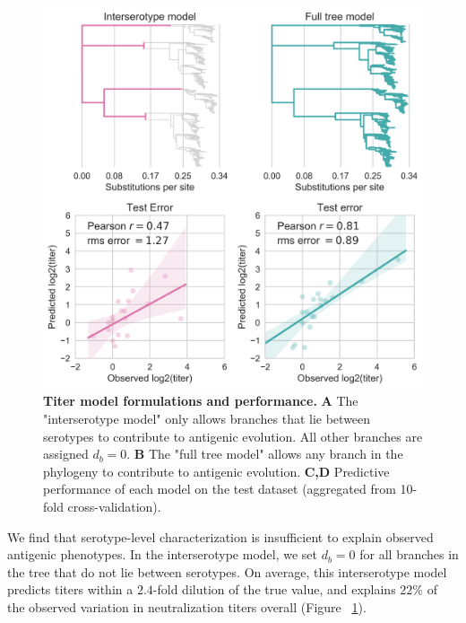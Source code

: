 \documentclass[11pt,oneside,letterpaper]{article}
\begin{document}
\begin{figure}[h]
  \begin{centering}
    \includegraphics[width=.8\textwidth]{../figures/png/titer_model_performance.png}
        \caption{\textbf{Titer model formulations and performance.} \linebreak \textbf{A} The "interserotype model" only allows branches that lie between serotypes to contribute to antigenic evolution. All other branches are assigned $d_b = 0$. \textbf{B} The "full tree model" allows any branch in the phylogeny to contribute to antigenic evolution. \textbf{C,D} Predictive performance of each model on the test dataset (aggregated from 10-fold cross-validation).}
         \label{titer_model_performance}
  \end{centering}
\end{figure}

We find that serotype-level characterization is insufficient to explain observed antigenic phenotypes.
In the interserotype model, we set $d_b = 0$ for all branches in the tree that do not lie between serotypes.
On average, this interserotype model predicts titers within a $2.4$-fold dilution of the true value, and explains $22\%$ of the observed variation in neutralization titers overall (Figure ~\ref{titer_model_performance}).
\end{document}
